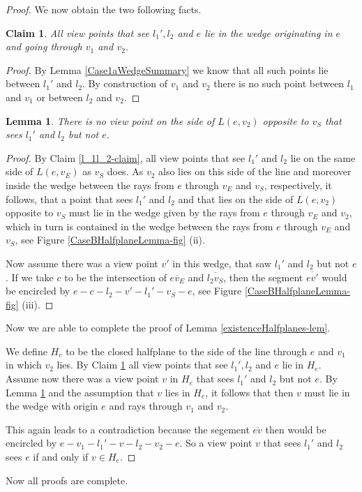 \documentclass[11pt]{article}
\newtheorem{lemma}{Lemma}
\newtheorem{claim}{Claim}
\begin{document}
\begin{proof}
We now obtain the two following facts.

\begin{claim} \label{v_1v_2-claim}
All view points that see $l_1', l_2$ and $e$ lie in the wedge originating in $e$ and going through $v_1$ and $v_2$.
\end{claim}

\begin{proof}
By Lemma \ref{Case1aWedgeSummary} we know that all such points lie between $l_1'$ and $l_2$. By construction of $v_1$ and $v_2$ there is no such point between $l_1$ and $v_1$ or between $l_2$ and $v_2$.
\end{proof}

\begin{lemma}\label{Case1aHalfplaneSummary}There is no view point on the side of $L(e,v_2)$ opposite to $v_S$ that sees $l_1'$ and $l_2$ but not $e$.
\end{lemma}

\begin{proof}
By Claim \ref{l_1l_2-claim}, all view points that see $l_1'$ and $l_2$ lie on the same side of $L(e,v_E)$ as $v_S$ does.  
As $v_2$ also lies on this side of the line and moreover inside the wedge between the rays from $e$ through $v_E$ and $v_S$, respectively, it follows, that a point that sees $l_1'$ and $l_2$ and that lies on the side of $L(e,v_2)$ opposite to $v_S$ must lie in the wedge given by the rays from $e$ through $v_E$ and $v_2$, which in turn is contained in the wedge between the rays from $e$ through $v_E$ and $v_S$, see Figure \ref{CaseBHalfplaneLemma-fig} (ii). 

Now assume there was a view point $v'$ in this wedge, that saw $l_1'$ and $l_2$ but not $e$. If we take $c$ to be the intersection of $\overline{ev_E}$ and $\overline{l_2v_S}$, then the segment $\overline{ev'}$ would be encircled by $e-c-l_2-v'-l_1'-v_S-e$, 
see Figure \ref{CaseBHalfplaneLemma-fig} (iii).

\end{proof}

Now we are able to complete the proof of Lemma \ref{existenceHalfplanes-lem}.

We define $H_e$ to be the closed halfplane to the side of the line through $e$ and $v_1$ in which $v_2$ lies. By Claim \ref{v_1v_2-claim} all view points that see $l_1',l_2$ and $e$ lie in $H_e$. Assume now there was a view point $v$ in $H_e$ 
that sees $l_1'$ and $l_2$ but not $e$. 
By Lemma \ref{Case1aHalfplaneSummary} and the assumption that $v$ lies in $H_e$, it follows that then $v$ must lie in the wedge with origin $e$ and rays through $v_1$ and $v_2$. 

This again leads to a contradiction because the segement $\overline{ev}$ then would be encircled by $e-v_1-l_1'-v-l_2-v_2-e$.
So a view point $v$ that sees $l_1'$ and $l_2$ sees $e$ if and only if $v\in H_e$.
\end{proof}
Now all proofs are complete.
\end{document}
